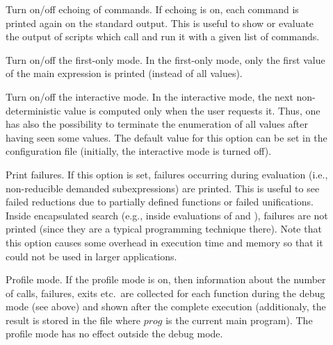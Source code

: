 \begin{description}
\item[]
Turn on/off echoing of commands.
If echoing is on, each command is printed again on the standard output.
This is useful to show or evaluate the output of scripts which call
\CYS and run it with a given list of commands.

\item[]%
Turn on/off the first-only mode.
In the first-only mode, only the first value
of the main expression is printed (instead of all values).

\item[]%
Turn on/off the interactive mode.
In the interactive mode, the next non-deterministic value
is computed only when the user requests it.
Thus, one has also the possibility to terminate the
enumeration of all values after having seen some values.
The default value for this option can be set in the
configuration file \ccode{\curryrc} (initially, the interactive
mode is turned off).

\item[] Print failures.
If this option is set, failures occurring during evaluation
(i.e., non-reducible demanded subexpressions) are printed.
This is useful to see failed reductions due to partially
defined functions or failed unifications.
Inside encapsulated search (e.g., inside evaluations of
 and ), failures are not printed
(since they are a typical programming technique there).
Note that this option causes some overhead in execution time
and memory so that it could not be used in larger applications.

\item[]%
Profile mode. If the profile mode is on, then information about
the number of calls, failures, exits etc.\ are collected for
each function during the debug mode (see above) and shown
after the complete execution (additionaly, the result is stored
in the file  where $prog$ is the current main program).
The profile mode has no effect outside the debug mode.


\end{description}
